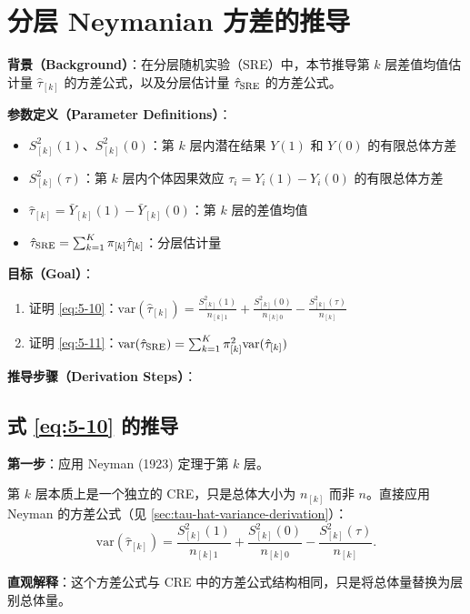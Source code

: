 \section{分层 Neymanian 方差的推导}\label{sec:appendix-5-10}\label{sec:appendix-5-sre-variance}\label{sec:appendix-5-equal-propensity}\label{sec:appendix-5-cre-sre-variance}\label{sec:appendix-5-variance-gain}

\textbf{背景（Background）}：在分层随机实验（SRE）中，本节推导第 $k$ 层差值均值估计量 $\hat{\tau}_{[k]}$ 的方差公式，以及分层估计量 $\hat{\tau}_{\text{SRE}}$ 的方差公式。

\textbf{参数定义（Parameter Definitions）}：
\begin{itemize}
  \item $S_{[k]}^2(1)$、$S_{[k]}^2(0)$：第 $k$ 层内潜在结果 $Y(1)$ 和 $Y(0)$ 的有限总体方差
  \item $S_{[k]}^2(\tau)$：第 $k$ 层内个体因果效应 $\tau_i = Y_i(1) - Y_i(0)$ 的有限总体方差
  \item $\hat{\tau}_{[k]} = \bar{Y}_{[k]}(1) - \bar{Y}_{[k]}(0)$：第 $k$ 层的差值均值
  \item $\hat{\tau}_{\text{SRE}} = \sum_{k=1}^K \pi_{[k]} \hat{\tau}_{[k]}$：分层估计量
\end{itemize}

\textbf{目标（Goal）}：
\begin{enumerate}
  \item 证明 \eqref{eq:5-10}：$\text{var}(\hat{\tau}_{[k]}) = \frac{S_{[k]}^2(1)}{n_{[k]1}} + \frac{S_{[k]}^2(0)}{n_{[k]0}} - \frac{S_{[k]}^2(\tau)}{n_{[k]}}$
  \item 证明 \eqref{eq:5-11}：$\text{var}(\hat{\tau}_{\text{SRE}}) = \sum_{k=1}^K \pi_{[k]}^2 \text{var}(\hat{\tau}_{[k]})$
\end{enumerate}

\textbf{推导步骤（Derivation Steps）}：

\subsection*{式 \eqref{eq:5-10} 的推导}

\textbf{第一步}：应用 Neyman (1923) 定理于第 $k$ 层。

第 $k$ 层本质上是一个独立的 CRE，只是总体大小为 $n_{[k]}$ 而非 $n$。直接应用 Neyman 的方差公式（见 \cref{sec:tau-hat-variance-derivation}）：
\[
\text{var}(\hat{\tau}_{[k]}) = \frac{S_{[k]}^2(1)}{n_{[k]1}} + \frac{S_{[k]}^2(0)}{n_{[k]0}} - \frac{S_{[k]}^2(\tau)}{n_{[k]}}.
\]

\textbf{直观解释}：这个方差公式与 CRE 中的方差公式结构相同，只是将总体量替换为层别总体量。

